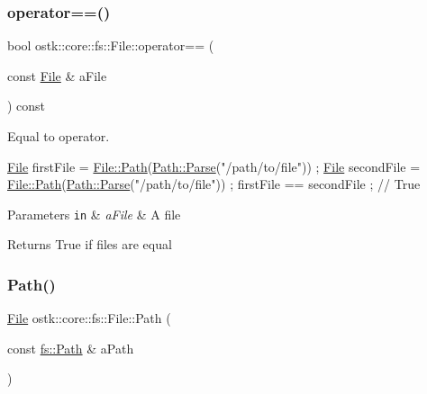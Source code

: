 \subsubsection{\texorpdfstring{operator==()}{operator==()}}
{\footnotesize\ttfamily bool ostk\+::core\+::fs\+::\+File\+::operator== (\begin{DoxyParamCaption}\item[{const \hyperlink{classostk_1_1core_1_1fs_1_1_file}{File} \&}]{a\+File }\end{DoxyParamCaption}) const}



Equal to operator. 


\begin{DoxyCode}
\hyperlink{classostk_1_1core_1_1fs_1_1_file_ad1695224996950be9962b8457da369b3}{File} firstFile = \hyperlink{classostk_1_1core_1_1fs_1_1_file_ad677c6a3edc1e88c18226edebff1da03}{File::Path}(\hyperlink{classostk_1_1core_1_1fs_1_1_path_ad08539ba654f5df11c4bcb07276345ad}{Path::Parse}(\textcolor{stringliteral}{"/path/to/file"})) ;
\hyperlink{classostk_1_1core_1_1fs_1_1_file_ad1695224996950be9962b8457da369b3}{File} secondFile = \hyperlink{classostk_1_1core_1_1fs_1_1_file_ad677c6a3edc1e88c18226edebff1da03}{File::Path}(\hyperlink{classostk_1_1core_1_1fs_1_1_path_ad08539ba654f5df11c4bcb07276345ad}{Path::Parse}(\textcolor{stringliteral}{"/path/to/file"})) ;
firstFile == secondFile ; \textcolor{comment}{// True}
\end{DoxyCode}



\begin{DoxyParams}[1]{Parameters}
\mbox{\tt in}  & {\em a\+File} & A file \\
\hline
\end{DoxyParams}
\begin{DoxyReturn}{Returns}
True if files are equal 
\end{DoxyReturn}
\mbox{\label{classostk_1_1core_1_1fs_1_1_file_ad677c6a3edc1e88c18226edebff1da03}} 
\subsubsection{\texorpdfstring{Path()}{Path()}}
{\footnotesize\ttfamily \hyperlink{classostk_1_1core_1_1fs_1_1_file}{File} ostk\+::core\+::fs\+::\+File\+::\+Path (\begin{DoxyParamCaption}\item[{const \hyperlink{classostk_1_1core_1_1fs_1_1_path}{fs\+::\+Path} \&}]{a\+Path }\end{DoxyParamCaption})\hspace{0.3cm}{\ttfamily [static]}}



